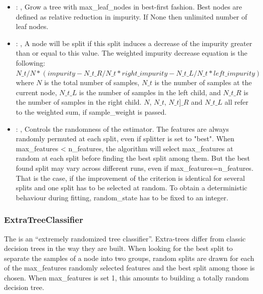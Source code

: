 \begin{itemize}
    \item {}: ,
      Grow a tree with max\_leaf\_nodes in best-first fashion. Best nodes are defined as relative
      reduction                                                  in impurity. If None then unlimited
      number of leaf nodes.

    \item {}: ,
      A node will be split if this split induces a decrease of the impurity greater than or equal to
      this value.                                                  The weighted impurity decrease
      equation is the following:                                                  $N\_t / N *
      (impurity - N\_t\_R / N\_t * right\_impurity - N\_t\_L / N\_t * left\_impurity)$
      where $N$ is the total number of samples, $N\_t$ is the number of samples at the current node,
      $N\_t\_L$ is the number                                                  of samples in the
      left child, and $N\_t\_R$ is the number of samples in the right child.
      $N$, $N\_t$, $N\_t]\_R$ and $N\_t\_L$ all refer to the weighted sum, if sample\_weight is
      passed.

    \item {}: ,
      Controls the randomness of the estimator. The features are
      always randomly permuted at each split, even if splitter is set to
      "best". When max\_features < n\_features, the algorithm will select
      max\_features at random at each split before finding the best split
      among them. But the best found split may vary across different runs,
      even if max\_features=n\_features. That is the case, if the improvement
      of the criterion is identical for several splits and one split has to
      be selected at random. To obtain a deterministic behaviour during
      fitting, random\_state has to be fixed to an integer.
  \end{itemize}


\subsubsection{ExtraTreeClassifier}
  The  is an ``extremely randomized tree classifier''.
  Extra-trees differ from classic decision trees in the way they are built. When looking for the
  best                          split to separate the samples of a node into two groups, random
  splits are drawn for each of the                          max\_features randomly selected features
  and the best split among those is chosen. When max\_features                          is set 1,
  this amounts to building a totally random decision tree.


